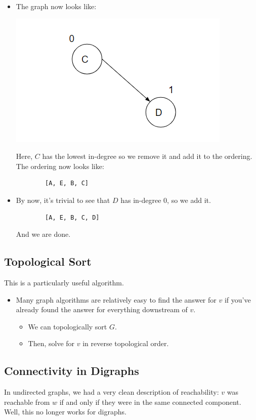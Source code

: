 \documentclass[letterpaper]{article}
\begin{document}
\begin{itemize}
\begin{center}
    \end{center}
    Here, note that $B$ is the only node with the lowest in-degree. So, we remove it and add it to the ordering. The ordering now looks like: 
    \begin{verbatim}
        [A, E, B]
    \end{verbatim}
    \item The graph now looks like:
    \begin{center}
        \includegraphics[scale=0.4]{../assets/dag_ex_deg_4.png}
    \end{center}
    Here, $C$ has the lowest in-degree so we remove it and add it to the ordering. The ordering now looks like: 
    \begin{verbatim}
        [A, E, B, C]
    \end{verbatim}
    \item By now, it's trivial to see that $D$ has in-degree 0, so we add it.
    \begin{verbatim}
        [A, E, B, C, D]
    \end{verbatim}
    And we are done. 
\end{itemize}

\subsection{Topological Sort}
This is a particularly useful algorithm. 
\begin{itemize}
    \item Many graph algorithms are relatively easy to find the answer for $v$ if you've already found the answer for everything downstream of $v$. 
    \begin{itemize}
        \item We can topologically sort $G$. 
        \item Then, solve for $v$ in reverse topological order.
    \end{itemize}
\end{itemize}

\subsection{Connectivity in Digraphs}
In undirected graphs, we had a very clean description of reachability: $v$ was reachable from $w$ if and only if they were in the same connected component. Well, this no longer works for digraphs. 
\end{document}
